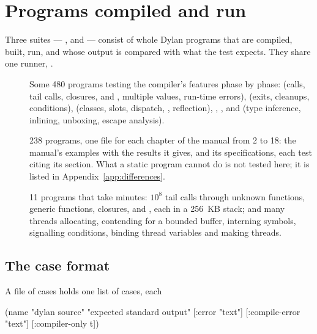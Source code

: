 \section{Programs compiled and run}\label{sec:test-programs}

Three suites --- ,  and
 --- consist of whole Dylan programs that are
compiled, built, run, and whose output is compared with what the test
expects. They share one runner, .

\begin{description}
\item[] Some 480 programs testing the
  compiler's features phase by phase:  (calls, tail
  calls, closures,  and , multiple values,
  run-time errors),  (exits, cleanups,
  conditions),  (classes, slots, dispatch,
  , reflection), ,
  ,  and
   (type inference, inlining, unboxing,
  escape analysis).
\item[] 238 programs, one file for each
  chapter of the manual from 2 to 18: the manual's examples with the
  results it gives, and its specifications, each test citing its
  section. What a static program cannot do is not tested here; it is
  listed in Appendix~\ref{app:differences}.
\item[] 11 programs that take minutes:
  $10^8$ tail calls through unknown functions, generic functions,
  closures,  and , each in a 256~KB stack;
  and many threads allocating, contending for a bounded buffer,
  interning symbols, signalling conditions, binding thread variables
  and making threads.
\end{description}

\subsection{The case format}\label{sec:test-case-format}

A file of cases holds one list of cases, each

\begin{lisp}
(name "dylan source" "expected standard output"
      [:error "text"] [:compile-error "text"] [:compiler-only t])
\end{lisp}

